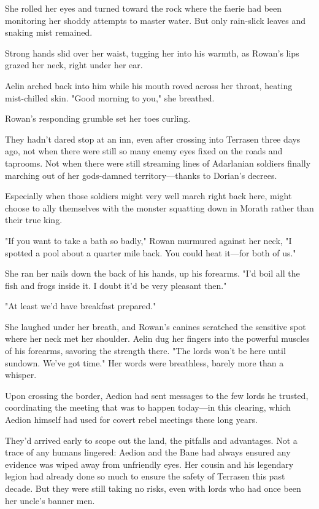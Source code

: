She rolled her eyes and turned toward the rock where the faerie had been monitoring her shoddy attempts to master water. But only rain-slick leaves and snaking mist remained.

Strong hands slid over her waist, tugging her into his warmth, as Rowan's lips grazed her neck, right under her ear.

Aelin arched back into him while his mouth roved across her throat, heating mist-chilled skin. "Good morning to you," she breathed.

Rowan's responding grumble set her toes curling.

They hadn't dared stop at an inn, even after crossing into Terrasen three days ago, not when there were still so many enemy eyes fixed on the roads and taprooms. Not when there were still streaming lines of Adarlanian soldiers finally marching out of her gods-damned territory---thanks to Dorian's decrees.

Especially when those soldiers might very well march right back here, might choose to ally themselves with the monster squatting down in Morath rather than their true king.

"If you want to take a bath so badly," Rowan murmured against her neck, "I spotted a pool about a quarter mile back. You could heat it---for both of us."

She ran her nails down the back of his hands, up his forearms. "I'd boil all the fish and frogs inside it. I doubt it'd be very pleasant then."

"At least we'd have breakfast prepared."

She laughed under her breath, and Rowan's canines scratched the sensitive spot where her neck met her shoulder. Aelin dug her fingers into the powerful muscles of his forearms, savoring the strength there. "The lords won't be here until sundown. We've got time." Her words were breathless, barely more than a whisper.

Upon crossing the border, Aedion had sent messages to the few lords he trusted, coordinating the meeting that was to happen today---in this clearing, which Aedion himself had used for covert rebel meetings these long years.

They'd arrived early to scope out the land, the pitfalls and advantages. Not a trace of any humans lingered: Aedion and the Bane had always ensured any evidence was wiped away from unfriendly eyes. Her cousin and his legendary legion had already done so much to ensure the safety of Terrasen this past decade. But they were still taking no risks, even with lords who had once been her uncle's banner men.

